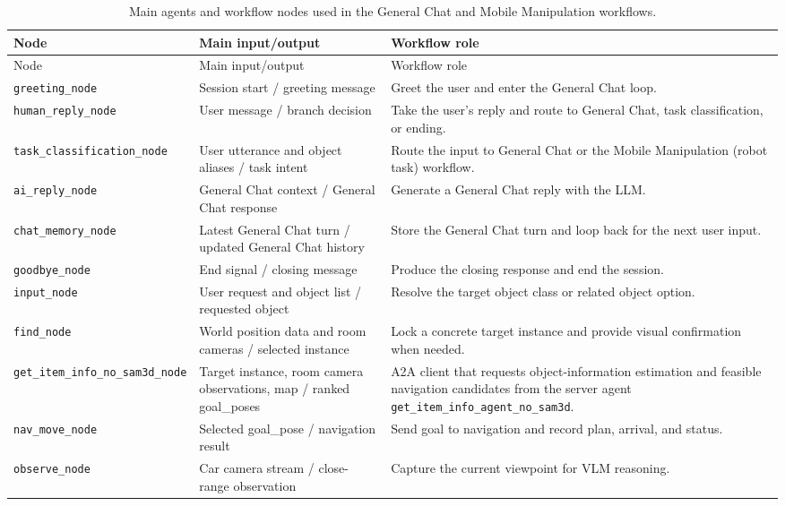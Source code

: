 \documentclass[12pt,a4paper]{article}
\begin{document}
\begingroup
\scriptsize
\setlength{\tabcolsep}{2pt}
\begin{longtable}{@{}P{0.26\textwidth}P{0.31\textwidth}P{0.35\textwidth}@{}}
\caption{Main agents and workflow nodes used in the General Chat and Mobile Manipulation workflows.}\label{tab:agent_roles}\\
\toprule
Node & Main input/output & Workflow role \\
\midrule
\endfirsthead
\toprule
Node & Main input/output & Workflow role \\
\midrule
\endhead
\texttt{greeting\_node} & Session start / greeting message & Greet the user and enter the General Chat loop. \\
\texttt{human\_reply\_node} & User message / branch decision & Take the user's reply and route to General Chat, task classification, or ending. \\
\texttt{task\_classification\_node} & User utterance and object aliases / task intent & Route the input to General Chat or the Mobile Manipulation (robot task) workflow. \\
\texttt{ai\_reply\_node} & General Chat context / General Chat response & Generate a General Chat reply with the LLM. \\
\texttt{chat\_memory\_node} & Latest General Chat turn / updated General Chat history & Store the General Chat turn and loop back for the next user input. \\
\texttt{goodbye\_node} & End signal / closing message & Produce the closing response and end the session. \\
\midrule
\texttt{input\_node} & User request and object list / requested object & Resolve the target object class or related object option. \\
\texttt{find\_node} & World position data and room cameras / selected instance & Lock a concrete target instance and provide visual confirmation when needed. \\
\texttt{get\_item\_info\_no\_sam3d\_node} & Target instance, room camera observations, map / ranked goal\_poses & A2A client that requests object-information estimation and feasible navigation candidates from the server agent \texttt{get\_item\_info\_agent\_no\_sam3d}. \\
\texttt{nav\_move\_node} & Selected goal\_pose / navigation result & Send goal to navigation and record plan, arrival, and status. \\
\texttt{observe\_node} & Car camera stream / close-range observation & Capture the current viewpoint for VLM reasoning. \\

\end{longtable}
\end{document}
